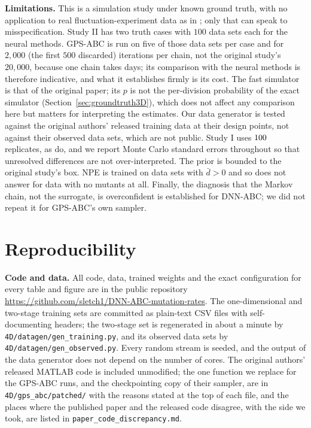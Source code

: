 \documentclass[sn-basic,iicol,pdflatex]{sn-jnl}
\begin{document}
\noindent\textbf{Limitations.} This is a simulation study under known ground truth, with no application to real
fluctuation-experiment data as in \citet{lu2023}; only that can speak to misspecification. Study II has two truth cases with
$100$ data sets each for the neural methods. GPS-ABC is run on five of those data sets per case and for $2{,}000$ (the first $500$ discarded)
iterations per chain, not the original study's $20{,}000$, because one chain takes days; its comparison with
the neural methods is therefore indicative, and what it establishes firmly is its cost. The fast simulator is that of the original
paper; its $p$ is not the per-division probability of the exact simulator (Section~\ref{sec:groundtruth3D}), which does not affect any comparison here but
matters for interpreting the estimates. Our data generator is tested against the original authors' released training data at their
design points, not against their observed data sets, which are not public. Study I uses $100$ replicates, as
\citeauthor{lu2023} do, and we report Monte Carlo standard errors throughout so that unresolved differences are not
over-interpreted. The prior is bounded to the original study's box. NPE is trained on data sets with $\bar d>0$ and so does not
answer for data with no mutants at all. Finally, the diagnosis that the Markov chain, not the surrogate, is overconfident is established for DNN-ABC; we did not repeat it for GPS-ABC's own sampler.

\section{Reproducibility}
\label{sec:repro}

\noindent\textbf{Code and data.} All code, data, trained weights and the exact configuration for every table and figure are in
the public repository \url{https://github.com/sletch1/DNN-ABC-mutation-rates}. The one-dimensional and two-stage training
sets are committed as plain-text CSV files with self-documenting headers; the two-stage set is regenerated in about a minute by
\texttt{4D/datagen/gen\_training.py}, and its observed data sets by \texttt{4D/datagen/gen\_observed.py}. Every random stream is
seeded, and the output of the data generator does not depend on the number of cores. The original authors' released MATLAB code
is included unmodified; the one function we replace for the GPS-ABC runs, and the checkpointing copy of their sampler, are in
\texttt{4D/gps\_abc/patched/} with the reasons stated at the top of each file, and the places where the published paper and the released code
disagree, with the side we took, are listed in \texttt{paper\_code\_discrepancy.md}.
\end{document}
